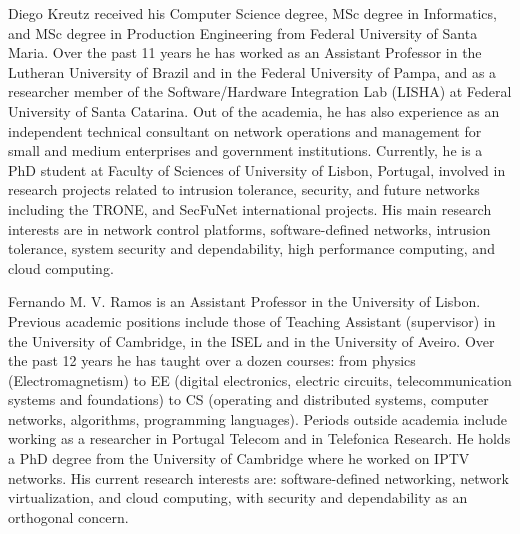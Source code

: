 \documentclass[journal]{IEEEtran}
\begin{document}
%
%




% 

\begin{IEEEbiographynophoto}{Diego Kreutz}
received his Computer Science degree, MSc degree in Informatics, and MSc degree in Production Engineering from Federal University of Santa Maria.
Over the past 11 years he has worked as an Assistant Professor in the Lutheran University of Brazil and in the Federal University of Pampa, and as a researcher member of the Software/Hardware Integration Lab (LISHA) at Federal University of Santa Catarina.
Out of the academia, he has also experience as an independent technical consultant on network operations and management for small and medium enterprises and government institutions.
Currently, he is a PhD student at Faculty of Sciences of University of Lisbon, Portugal, involved in research projects related to intrusion tolerance, security, and future networks including the TRONE, and SecFuNet international projects. 
His main research interests are in network control platforms, software-defined networks, intrusion tolerance, system security and dependability, high performance computing, and cloud computing. 
\end{IEEEbiographynophoto}

\begin{IEEEbiographynophoto}{Fernando M. V. Ramos}
 is an Assistant Professor in the University of Lisbon. Previous academic positions include  those of Teaching Assistant (supervisor) in the University of Cambridge, in the ISEL and in the University of Aveiro. Over the past 12 years he has taught over a dozen courses: from physics (Electromagnetism) to EE (digital electronics, electric circuits, telecommunication systems and foundations) to CS (operating and distributed systems, computer networks, algorithms, programming languages).
Periods outside academia include working as a researcher in Portugal Telecom and in Telefonica Research.
He holds a PhD degree from the University of Cambridge where he worked on IPTV networks.
His current research interests are: software-defined networking, network virtualization, and cloud computing, with security and dependability as an orthogonal concern.
\end{IEEEbiographynophoto}
\end{document}
